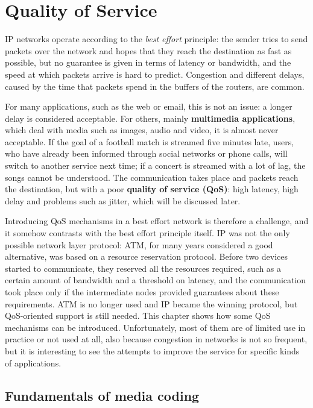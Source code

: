 \chapter{Quality of Service}

IP networks operate according to the \emph{best effort} principle: the sender tries to send packets over the network and hopes that they reach the destination as fast as possible, but no guarantee is given in terms of latency or bandwidth, and the speed at which packets arrive is hard to predict. Congestion and different delays, caused by the time that packets spend in the buffers of the routers, are common.

For many applications, such as the web or email, this is not an issue: a longer delay is considered acceptable. For others, mainly \textbf{multimedia applications}, which deal with media such as images, audio and video, it is almost never acceptable. If the goal of a football match is streamed five minutes late, users, who have already been informed through social networks or phone calls, will switch to another service next time; if a concert is streamed with a lot of lag, the songs cannot be understood. The communication takes place and packets reach the destination, but with a poor \textbf{quality of service (QoS)}: high latency, high delay and problems such as jitter, which will be discussed later.

Introducing QoS mechanisms in a best effort network is therefore a challenge, and it somehow contrasts with the best effort principle itself. IP was not the only possible network layer protocol: ATM, for many years considered a good alternative, was based on a resource reservation protocol. Before two devices started to communicate, they reserved all the resources required, such as a certain amount of bandwidth and a threshold on latency, and the communication took place only if the intermediate nodes provided guarantees about these requirements. ATM is no longer used and IP became the winning protocol, but QoS-oriented support is still needed. This chapter shows how some QoS mechanisms can be introduced. Unfortunately, most of them are of limited use in practice or not used at all, also because congestion in networks is not so frequent, but it is interesting to see the attempts to improve the service for specific kinds of applications.

\section{Fundamentals of media coding}

